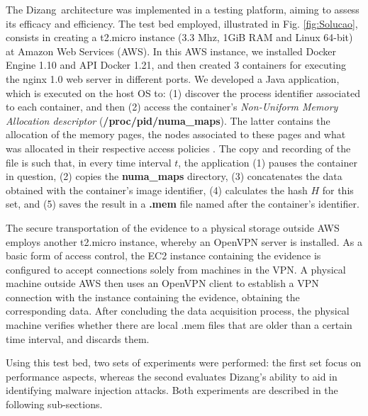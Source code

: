 \documentclass[10pt,journal,compsoc]{IEEEtran}
\newcommand{\marcos}[1]{{\color{green}{MARCOS: #1}}}
\newcommand{\fancyname}{Dizang}
\begin{document}
The \fancyname\ architecture was implemented in a testing platform, aiming to assess its efficacy and efficiency.
%
The test bed employed, illustrated in Fig. \ref{fig:Solucao}, consists in creating a t2.micro instance (3.3 Mhz, 1GiB RAM and Linux 64-bit) at Amazon Web Services (AWS).
%
In this AWS instance, we installed Docker Engine 1.10 and API Docker 1.21, and then created 3 containers for executing the nginx 1.0 web server in different ports. 
%
We developed a Java application, which is executed on the host OS to: 
(1) discover the process identifier associated to each container, and then 
(2) access the container's 
\textit{Non-Uniform Memory Allocation descriptor} (\textbf{/proc/pid/numa\_maps}).
%
The latter contains the allocation of the memory pages, the nodes associated to these pages and what was allocated in their respective access policies \cite{UnixManPages_numa_maps}.
%
The copy and recording of the file is such that, in every time interval $t$, the application (1) pauses the container in question, (2) copies the \textbf{numa\_maps} directory, (3) concatenates the data obtained with the container's image identifier, (4) calculates the hash $H$ for this set, and (5) saves the result in a \textbf{.mem} file named after the container's identifier.


The secure transportation of the evidence to a physical storage outside AWS employs another t2.micro instance, whereby an OpenVPN server is installed.
%
As a basic form of access control, the EC2 instance containing the evidence is configured to accept connections solely from machines in the VPN.
%
A physical machine outside AWS then uses an OpenVPN client to establish a VPN connection with the instance containing the evidence, obtaining the corresponding data.
%
After concluding the data acquisition process, the physical machine verifies whether there are local .mem files that are older than a certain time interval, and discards them.


Using this test bed, two sets of experiments were performed: the first set focus on performance aspects, whereas the second evaluates \fancyname's ability to aid in identifying malware injection attacks.
%
Both experiments are described in the following sub-sections.
\end{document}
